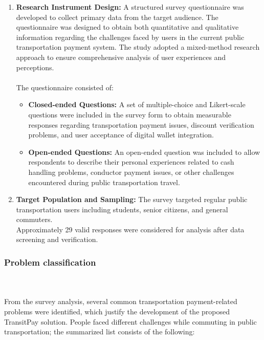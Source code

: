 \documentclass[sigconf, nonacm]{acmart}
\begin{document}
\begin{enumerate}

\item \textbf{Research Instrument Design:} 
A structured survey questionnaire was developed to collect primary data from the target audience. The questionnaire was designed to obtain both quantitative and qualitative information regarding the challenges faced by users in the current public transportation payment system. The study adopted a mixed-method research approach to ensure comprehensive analysis of user experiences and perceptions.
\\
\\
The questionnaire consisted of:
\\
\begin{itemize}

\item \textbf{Closed-ended Questions:} 
A set of multiple-choice and Likert-scale questions were included in the survey form to obtain measurable responses regarding transportation payment issues, discount verification problems, and user acceptance of digital wallet integration.

\item \textbf{Open-ended Questions:} 
An open-ended question was included to allow respondents to describe their personal experiences related to cash handling problems, conductor payment issues, or other challenges encountered during public transportation travel.
\\
\end{itemize}

\item \textbf{Target Population and Sampling:} The survey targeted regular public transportation users including students, senior citizens, and general commuters.
\\
Approximately 29 valid responses were considered for analysis after data screening and verification.

\end{enumerate}
\subsubsection{Problem classification} \mbox{} \\
\\
From the survey analysis, several common transportation payment-related problems were identified, which justify the development of the proposed TransitPay solution. People faced different challenges while commuting in public transportation; the summarized list consists of the following:
\end{document}
